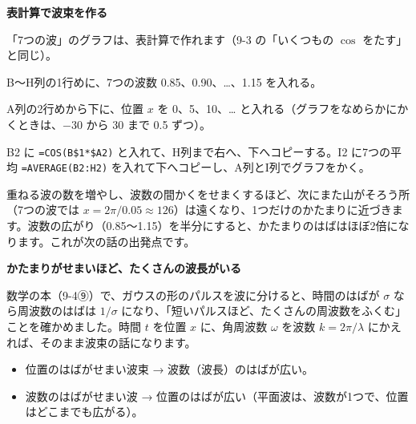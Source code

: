 \noindent\textbf{表計算で波束を作る}\par\nobreak
「7つの波」のグラフは、表計算で作れます（9-3 の「いくつもの $\cos$ をたす」と同じ）。
\begin{enumerate}[label={\bkcircled[bkGreen]{\arabic*}}, leftmargin=2.4\zw, itemsep=1pt, topsep=2pt]
\item B〜H列の1行めに、7つの波数 0.85、0.90、…、1.15 を入れる。
\item A列の2行めから下に、位置 $x$ を 0、5、10、… と入れる（グラフをなめらかにかくときは、$-30$ から 30 まで 0.5 ずつ）。
\item B2 に \texttt{=COS(B\$1*\$A2)} と入れて、H列まで右へ、下へコピーする。I2 に7つの平均 \texttt{=AVERAGE(B2:H2)} を入れて下へコピーし、A列とI列でグラフをかく。
\end{enumerate}
\begin{bkcenter}
\label{ph:原-3:tab-sheet}
\end{bkcenter}
重ねる波の数を増やし、波数の間かくをせまくするほど、次にまた山がそろう所（7つの波では $x=2\pi/0.05\approx126$）は遠くなり、1つだけのかたまりに近づきます。波数の広がり（0.85〜1.15）を半分にすると、かたまりのはばはほぼ2倍になります。これが次の話の出発点です。

\noindent\textbf{かたまりがせまいほど、たくさんの波長がいる}\par\nobreak
数学の本（9-4⑨）で、ガウスの形のパルスを波に分けると、時間のはばが $\sigma$ なら周波数のはばは $1/\sigma$ になり、「短いパルスほど、たくさんの周波数をふくむ」ことを確かめました。時間 $t$ を位置 $x$ に、角周波数 $\omega$ を波数 $k=2\pi/\lambda$ にかえれば、そのまま波束の話になります。
\begin{itemize}[leftmargin=1.2\zw, itemsep=2pt, topsep=2pt, label={\color{bkTheme}●}]
\item 位置のはばがせまい波束 → 波数（波長）のはばが広い。
\item 波数のはばがせまい波 → 位置のはばが広い（平面波は、波数が1つで、位置はどこまでも広がる）。
\end{itemize}

